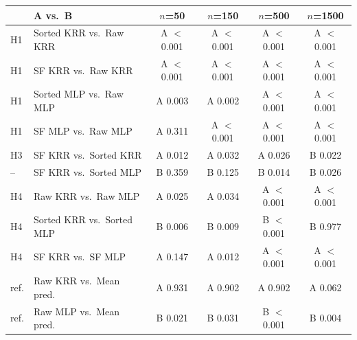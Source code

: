 \begin{tabular}{llcccc}
\toprule
 & A vs.\ B & $n$=50 & $n$=150 & $n$=500 & $n$=1500 \\
\midrule
H1 & Sorted KRR vs.\ Raw KRR & A $<$0.001 & A $<$0.001 & A $<$0.001 & A $<$0.001 \\
H1 & SF KRR vs.\ Raw KRR & A $<$0.001 & A $<$0.001 & A $<$0.001 & A $<$0.001 \\
H1 & Sorted MLP vs.\ Raw MLP & A 0.003 & A 0.002 & A $<$0.001 & A $<$0.001 \\
H1 & SF MLP vs.\ Raw MLP & A 0.311 & A $<$0.001 & A $<$0.001 & A $<$0.001 \\
H3 & SF KRR vs.\ Sorted KRR & A 0.012 & A 0.032 & A 0.026 & B 0.022 \\
-- & SF KRR vs.\ Sorted MLP & B 0.359 & B 0.125 & B 0.014 & B 0.026 \\
H4 & Raw KRR vs.\ Raw MLP & A 0.025 & A 0.034 & A $<$0.001 & A $<$0.001 \\
H4 & Sorted KRR vs.\ Sorted MLP & B 0.006 & B 0.009 & B $<$0.001 & B 0.977 \\
H4 & SF KRR vs.\ SF MLP & A 0.147 & A 0.012 & A $<$0.001 & A $<$0.001 \\
ref. & Raw KRR vs.\ Mean pred. & A 0.931 & A 0.902 & A 0.902 & A 0.062 \\
ref. & Raw MLP vs.\ Mean pred. & B 0.021 & B 0.031 & B $<$0.001 & B 0.004 \\
\bottomrule
\end{tabular}
